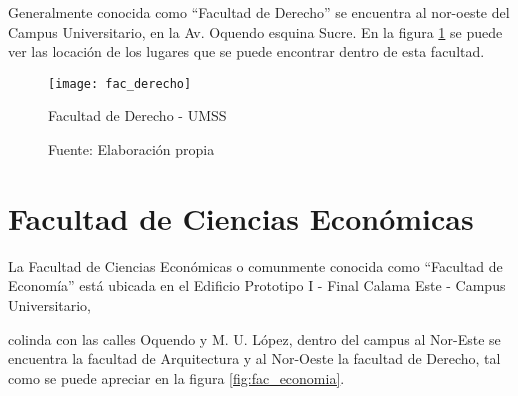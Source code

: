 
 Generalmente conocida como ``Facultad de Derecho'' se encuentra al nor-oeste del Campus Universitario, en la Av. Oquendo esquina Sucre. En la figura \ref{fig:fac_derecho} se puede ver las locación de los lugares que se puede encontrar dentro de esta facultad.

 \begin{figure}[H]
   \begin{center}
     \texttt{[image: fac\_derecho]}
     \caption{Facultad de Derecho - UMSS}
     \label{fig:fac_derecho}
     \caption*{Fuente: Elaboración propia}
   \end{center}
 \end{figure}

 








\section{Facultad de Ciencias Económicas}
\label{sec:facultad_economia}

      La Facultad de Ciencias Económicas o comunmente conocida como ``Facultad de Economía'' está ubicada en el Edificio Prototipo I - Final Calama Este - Campus Universitario,

      colinda con las calles Oquendo y M. U. López, dentro del campus al Nor-Este se encuentra la facultad de Arquitectura y al Nor-Oeste la facultad de Derecho, tal como se puede apreciar en la figura \ref{fig:fac_economia}.

